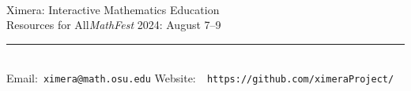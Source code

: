 \documentclass{article}
\begin{document}
\sffamily\flushleft
\hspace{-.3cm}\\
Ximera: Interactive Mathematics Education  \\[-.1cm] Resources for All\hfill \textsl{MathFest} 2024: August 7--9\\[.1cm]
\rule{\textwidth}{.1cm}\\[.1cm]\rmfamily
Email:~{\tt ximera@math.osu.edu} \hfill Website:~{\tt
https://github.com/ximeraProject/}\\[1cm]
\end{document}
